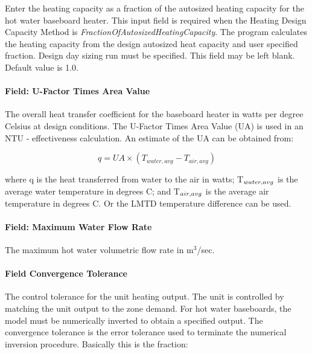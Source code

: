 Enter the heating capacity as a fraction of the autosized heating capacity for the hot water baseboard heater. This input field is required when the Heating Design Capacity Method is \emph{FractionOfAutosizedHeatingCapacity}. The program calculates the heating capacity from the design autosized heat capacity and user specified fraction. Design day sizing run must be specified. This field may be left blank. Default value is 1.0.

\paragraph{Field: U-Factor Times Area Value}\label{field-u-factor-times-area-value-000}

The overall heat transfer coefficient for the baseboard heater in watts per degree Celsius at design conditions. The U-Factor Times Area Value (UA) is used in an NTU - effectiveness calculation. An estimate of the UA can be obtained from:

\begin{equation}
q = UA \times ({T_{water,avg}} - {T_{air,avg}})
\end{equation}

where q is the heat transferred from water to the air in watts; T\(_{water,\\ avg}\) is the average water temperature in degrees C; and T\(_{air,\\ avg}\) is the average air temperature in degrees C. Or the LMTD temperature difference can be used.

\paragraph{Field: Maximum Water Flow Rate}\label{field-maximum-water-flow-rate-1-000}

The maximum hot water volumetric flow rate in m\(^{3}\)/sec.

\paragraph{Field Convergence Tolerance}\label{field-convergence-tolerance-2-000}

The control tolerance for the unit heating output. The unit is controlled by matching the unit output to the zone demand. For hot water baseboards, the model must be numerically inverted to obtain a specified output. The convergence tolerance is the error tolerance used to terminate the numerical inversion procedure. Basically this is the fraction:

